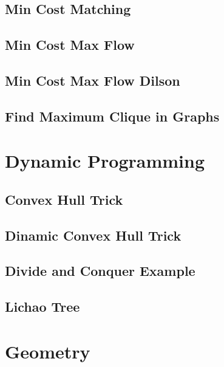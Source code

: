 \subsection{Min Cost Matching}
\raggedbottom
\hrulefill
\subsection{Min Cost Max Flow}
\raggedbottom
\hrulefill
\subsection{Min Cost Max Flow Dilson}
\raggedbottom
\hrulefill
\subsection{Find Maximum Clique in Graphs}
\raggedbottom
\hrulefill

\section{Dynamic Programming}
\subsection{Convex Hull Trick}
\raggedbottom
\hrulefill
\subsection{Dinamic Convex Hull Trick}
\raggedbottom
\hrulefill
\subsection{Divide and Conquer Example}
\raggedbottom
\hrulefill
\subsection{Lichao Tree}
\raggedbottom
\hrulefill

\section{Geometry}
